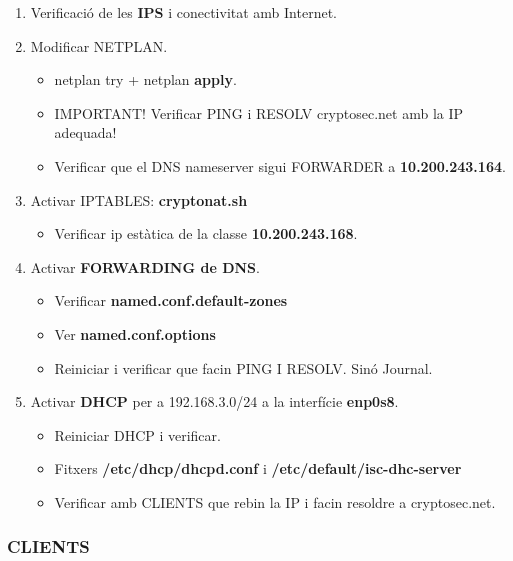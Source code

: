 \documentclass[]{article}
\providecommand{\tightlist}{%
  \setlength{\itemsep}{0pt}\setlength{\parskip}{0pt}}
\begin{document}
\begin{enumerate}
\def\labelenumi{\arabic{enumi}.}
\item
  Verificació de les \textbf{IPS} i conectivitat amb Internet.
\item
  Modificar NETPLAN.

  \begin{itemize}
  \item
    netplan try + netplan \textbf{apply}.
  \item
    IMPORTANT! Verificar PING i RESOLV cryptosec.net amb la IP adequada!
  \item
    Verificar que el DNS nameserver sigui FORWARDER a
    \textbf{10.200.243.164}.
  \end{itemize}
\item
  Activar IPTABLES: \textbf{cryptonat.sh}

  \begin{itemize}
  \tightlist
  \item
    Verificar ip estàtica de la classe \textbf{10.200.243.168}.
  \end{itemize}
\item
  Activar \textbf{FORWARDING de DNS}.

  \begin{itemize}
  \item
    Verificar \textbf{named.conf.default-zones}
  \item
    Ver \textbf{named.conf.options}
  \item
    Reiniciar i verificar que facin PING I RESOLV. Sinó Journal.
  \end{itemize}
\item
  Activar \textbf{DHCP} per a 192.168.3.0/24 a la interfície
  \textbf{enp0s8}.

  \begin{itemize}
  \item
    Reiniciar DHCP i verificar.
  \item
    Fitxers \textbf{/etc/dhcp/dhcpd.conf} i
    \textbf{/etc/default/isc-dhc-server}
  \item
    Verificar amb CLIENTS que rebin la IP i facin resoldre a
    cryptosec.net.
  \end{itemize}
\end{enumerate}

\hypertarget{clients}{%
\subsubsection{\texorpdfstring{\textbf{CLIENTS}}{CLIENTS}}\label{clients}}
\end{document}
